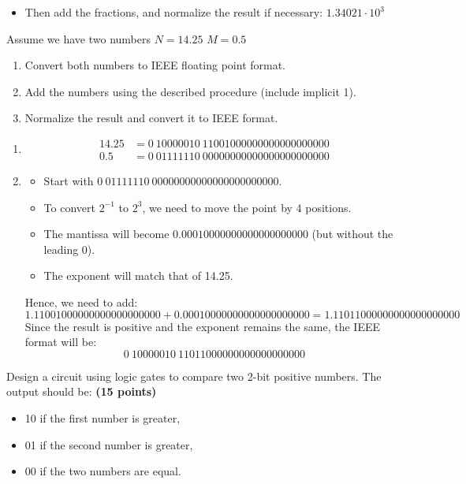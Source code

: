 \documentclass[10pt,answers]{exam}
\newcommand{\qpoints}[1]{\hfill \textbf{(#1 points)}}
\begin{document}
\begin{questions}
\begin{itemize}
\item Then add the fractions, and normalize the result if necessary:  
\(1.34021 \cdot 10^3\)
\end{itemize}

Assume we have two numbers \(N=14.25\) \(M=0.5\)  
\begin{enumerate}[label=\alph*)]
    \item Convert both numbers to IEEE floating point format.  
    \item Add the numbers using the described procedure (include implicit 1).  
    \item Normalize the result and convert it to IEEE format.  
\end{enumerate}

\begin{solution}
	 
	\begin{enumerate}[label=\alph*)]
		\item 
		\begin{align*}
		14.25 &= 0\ 10000010\ 11001000000000000000000 \\
		0.5 &= 0\ 01111110\ 00000000000000000000000
		\end{align*}
		\item
		\begin{itemize}
			\item Start with \(0\ 01111110\ 00000000000000000000000\).
			\item To convert \(2^{-1}\) to \(2^3\), we need to move the point by 4 positions. 
			\item The mantissa will become \(0.00010000000000000000000\) (but without the leading 0).
			\item The exponent will match that of 14.25.
		\end{itemize}
		Hence, we need to add:
		\[
		1.11001000000000000000000 + 0.00010000000000000000000 = 1.11011000000000000000000
		\]
		Since the result is positive and the exponent remains the same, the IEEE format will be:
		\[
		0\ 10000010\ 11011000000000000000000
		\]
	\end{enumerate}	
	
\end{solution}

\newpage
\question Design a circuit using logic gates to compare two 2-bit positive numbers. The output should be: \qpoints{15}
\begin{itemize}
    \item 10 if the first number is greater,
    \item 01 if the second number is greater,
    \item 00 if the two numbers are equal.
\end{itemize}


\end{questions}
\end{document}

